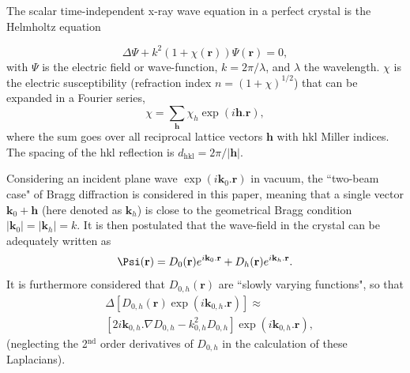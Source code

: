 \documentclass[preprint]{iucr}              %
\newcommand{\inred}[1]{{\color{red}#1}}
\begin{document}
The scalar time-independent x-ray wave equation in a perfect crystal is \inred{the Helmholtz equation}

\begin{equation}
\label{eq:helmholz}
    \Delta \Psi + k^2 (1+\chi(\textbf{r})) \Psi(\textbf{r}) = 0,
\end{equation}
with $\Psi$ is the electric field or wave-function, $k=2\pi/\lambda$, and $\lambda$ the wavelength. $\chi$ is the electric susceptibility (refraction index $n=(1+\chi)^{1/2}$) 
that can be expanded in a Fourier series,
\begin{equation}
\label{eq:chi}
    \chi = \sum_{\textbf{h}} \chi_h \exp(i \textbf{h} . \textbf{r}),
\end{equation}
where 
the sum goes over all reciprocal lattice vectors $\textbf{h}$ with hkl Miller indices. 
The spacing of the hkl reflection is $d_\text{hkl}=2 \pi/|\textbf{h}|$.

Considering an incident plane wave $\exp(i\textbf{k}_0 . \textbf{r})$ in vacuum, the ``two-beam case" of Bragg diffraction is considered in this paper, meaning that a single vector $\textbf{k}_0+\textbf{h}$ (here denoted as $\textbf{k}_h$) is close to the geometrical Bragg condition $|\textbf{k}_0|=|\textbf{k}_h|=k$.
It is then postulated that the wave-field in the crystal can be adequately written as  
\begin{equation}
\label{eq:wavefield}
    \Psi(\textbf r) = D_0(\textbf r) e^{i \textbf k_0 . \textbf r} + D_h(\textbf r) e^{i \textbf k_h . \textbf r}.
\end{equation}
It is furthermore considered that $D_{0,h}(\textbf{r})$ are ``slowly varying functions", so that 
\begin{subequations}
\label{eq:approxslowlyvarying}
\begin{align}
&\Delta[D_{0,h}(\textbf{r}) \exp(i\textbf{k}_{0,h} . \textbf{r})] \approx \nonumber  \\
& [2 i \textbf{k}_{0,h} . \nabla D_{0,h} - k^2_{0,h} D_{0,h}] \exp(i\textbf{k}_{0,h} . \textbf{r}),
\end{align}
\end{subequations}
(neglecting the 2$^{\text{nd}}$ order derivatives of $D_{0,h}$ in the calculation of these Laplacians).
\end{document}
